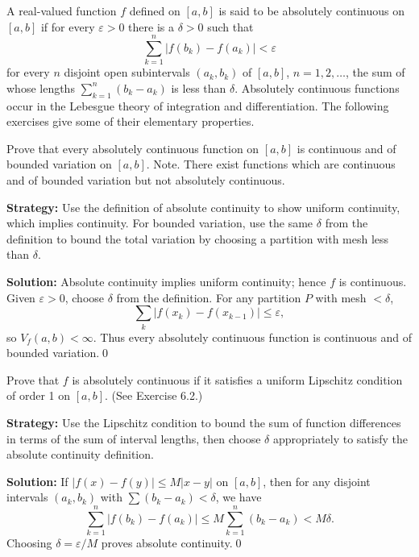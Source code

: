 \begin{problembox}
\begin{problemstatement}
A real-valued function $f$ defined on $[a, b]$ is said to be absolutely continuous on $[a, b]$ if for every $\varepsilon > 0$ there is a $\delta > 0$ such that
\[\sum_{k=1}^{n} |f(b_k) - f(a_k)| < \varepsilon\]
for every $n$ disjoint open subintervals $(a_k, b_k)$ of $[a, b]$, $n = 1, 2, \ldots$, the sum of whose lengths $\sum_{k=1}^{n} (b_k - a_k)$ is less than $\delta$. Absolutely continuous functions occur in the Lebesgue theory of integration and differentiation. The following exercises give some of their elementary properties.

Prove that every absolutely continuous function on $[a, b]$ is continuous and of bounded variation on $[a, b]$. Note. There exist functions which are continuous and of bounded variation but not absolutely continuous.
\end{problemstatement}
\end{problembox}

\noindent\textbf{Strategy:} Use the definition of absolute continuity to show uniform continuity, which implies continuity. For bounded variation, use the same $\delta$ from the definition to bound the total variation by choosing a partition with mesh less than $\delta$.

\bigskip\noindent\textbf{Solution:}
Absolute continuity implies uniform continuity; hence $f$ is continuous. Given $\varepsilon>0$, choose $\delta$ from the definition. For any partition $P$ with mesh $<\delta$,
\[\sum_k |f(x_k)-f(x_{k-1})|\le\varepsilon,\]
so $V_f(a,b)<\infty$. Thus every absolutely continuous function is continuous and of bounded variation.\qed


\begin{problembox}
\begin{problemstatement}
Prove that $f$ is absolutely continuous if it satisfies a uniform Lipschitz condition of order 1 on $[a, b]$. (See Exercise 6.2.)
\end{problemstatement}
\end{problembox}

\noindent\textbf{Strategy:} Use the Lipschitz condition to bound the sum of function differences in terms of the sum of interval lengths, then choose $\delta$ appropriately to satisfy the absolute continuity definition.

\bigskip\noindent\textbf{Solution:}
If $|f(x)-f(y)|\le M|x-y|$ on $[a,b]$, then for any disjoint intervals $(a_k,b_k)$ with $\sum(b_k-a_k)<\delta$, we have
\[\sum_{k=1}^n |f(b_k)-f(a_k)|\le M\sum_{k=1}^n(b_k-a_k)<M\delta.
\]
Choosing $\delta=\varepsilon/M$ proves absolute continuity.\qed


